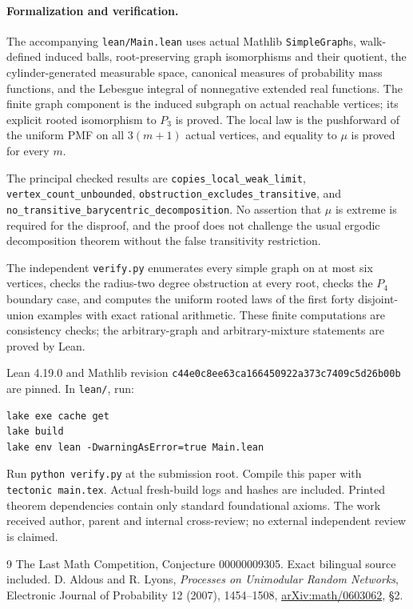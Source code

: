 \documentclass[11pt]{article}
\begin{document}
\paragraph{Formalization and verification.}
The accompanying \texttt{lean/Main.lean} uses actual Mathlib
\texttt{SimpleGraph}s, walk-defined induced balls, root-preserving graph
isomorphisms and their quotient, the cylinder-generated measurable
space, canonical measures of probability mass functions, and the
Lebesgue integral of nonnegative extended real functions.  The finite
graph component is the induced subgraph on actual reachable vertices;
its explicit rooted isomorphism to $P_3$ is proved.  The local law is
the pushforward of the uniform PMF on all $3(m+1)$ actual vertices,
and equality to $\mu$ is proved for every $m$.

The principal checked results are
\texttt{copies\_local\_weak\_limit},
\texttt{vertex\_count\_unbounded},
\texttt{obstruction\_excludes\_transitive}, and
\texttt{no\_transitive\_barycentric\_decomposition}.
No assertion that $\mu$ is extreme is required for the disproof, and
the proof does not challenge the usual ergodic decomposition theorem
without the false transitivity restriction.

The independent \texttt{verify.py} enumerates every simple graph on
at most six vertices, checks the radius-two degree obstruction at every
root, checks the $P_4$ boundary case, and computes the uniform rooted
laws of the first forty disjoint-union examples with exact rational
arithmetic.  These finite computations are consistency checks;
the arbitrary-graph and arbitrary-mixture statements are proved by Lean.

Lean 4.19.0 and Mathlib revision
\texttt{c44e0c8ee63ca166450922a373c7409c5d26b00b} are pinned.
In \texttt{lean/}, run:
\begin{verbatim}
lake exe cache get
lake build
lake env lean -DwarningAsError=true Main.lean
\end{verbatim}
Run \texttt{python verify.py} at the submission root.
Compile this paper with \texttt{tectonic main.tex}.
Actual fresh-build logs and hashes are included. Printed theorem
dependencies contain only standard foundational axioms.
The work received author, parent and internal cross-review;
no external independent review is claimed.
\begin{thebibliography}{9}
 The Last Math Competition, Conjecture 00000009305.
Exact bilingual source included.
 D. Aldous and R. Lyons,
\emph{Processes on Unimodular Random Networks},
Electronic Journal of Probability 12 (2007), 1454--1508,
\href{https://arxiv.org/abs/math/0603062}{arXiv:math/0603062}, \S2.
\end{thebibliography}
\end{document}
